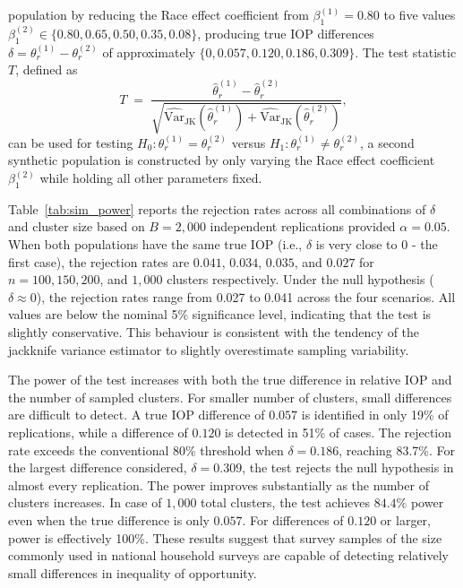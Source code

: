 \documentclass[12pt]{article}
\theoremstyle{plain}
\theoremstyle{definition}
\begin{document}
population by reducing the Race effect coefficient from
$\beta_1^{(1)} = 0.80$ to five values $\beta_1^{(2)} \in
\{0.80, 0.65, 0.50, 0.35, 0.08\}$, producing true IOP differences
$\delta = \theta_r^{(1)} - \theta_r^{(2)}$ of approximately
$\{0, 0.057, 0.120, 0.186, 0.309\}$.
The test statistic $T$, defined as 
\begin{equation}
    T \;=\; \frac{\hat{\theta}_r^{(1)} - \hat{\theta}_r^{(2)}}
                 {\sqrt{\widehat{\mathrm{Var}}_{\mathrm{JK}}(\hat{\theta}_r^{(1)})
                        + \widehat{\mathrm{Var}}_{\mathrm{JK}}(\hat{\theta}_r^{(2)})}},
    \label{eq:wald_test}
\end{equation}
can be used for testing $H_0\colon \theta_r^{(1)} = \theta_r^{(2)}$
versus $H_1\colon \theta_r^{(1)} \neq \theta_r^{(2)}$, a second synthetic
population is constructed by only varying the Race effect coefficient $\beta_1^{(2)}$ while holding all other parameters fixed.

Table~\ref{tab:sim_power} reports the rejection rates across all combinations of $\delta$ and cluster size based on $B = 2{,}000$ independent replications provided $\alpha = 0.05$. When both populations have the same true IOP (i.e., $\delta$ is very close to $0$ - the first case), the rejection rates are $0.041$, $0.034$, $0.035$, and $0.027$ for $n = 100, 150, 200$, and $1{,}000$ clusters respectively. Under the null hypothesis ($\delta \approx 0$), the rejection rates range from 0.027 to 0.041 across the four scenarios. All values are below the nominal 5\% significance level, indicating that the test is slightly conservative. This behaviour is consistent with the tendency of the jackknife variance estimator to slightly overestimate sampling variability.

The power of the test increases with both the true difference in relative IOP and the number of sampled clusters. For smaller number of clusters, small differences are difficult to detect. A true IOP difference of $0.057$ is identified in only 19\% of replications, while a difference of $0.120$ is detected in 51\% of cases. The rejection rate exceeds the conventional 80\% threshold when $\delta=0.186$, reaching 83.7\%. For the largest difference considered, $\delta=0.309$, the test rejects the null hypothesis in almost every replication. The power improves substantially as the number of clusters increases. In case of $1,000$ total clusters, the test achieves $84.4\%$ power even when the true difference is only $0.057$. For differences of $0.120$ or larger, power is effectively 100\%. These results suggest that survey samples of the size commonly used in national household surveys are capable of detecting relatively small differences in inequality of opportunity.
\end{document}

